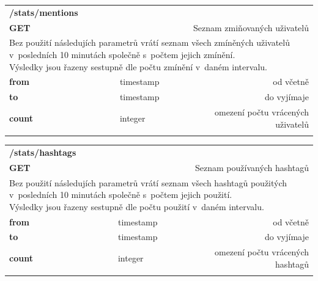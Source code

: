 \documentclass[thesis=B,czech]{FITthesis}[2012/06/26]
\begin{document}
\begin{table}[h]
\begin{tabular}{llllr}
\rowcolor[HTML]{EFEFEF}
\large \textbf{/stats/mentions}        &         &                 &        & \multicolumn{1}{l}{}                \\
\rowcolor[HTML]{EFEFEF}
\textbf{GET}          &         &                 &        & Seznam zmiňovaných uživatelů                        \\
\multicolumn{5}{l}{\parbox[t]{12.8cm}{Bez použití následujích parametrů vrátí seznam všech zmíněných uživatelů v~posledních 10 minutách společně s~počtem jejich zmínění. \\ Výsledky jsou řazeny sestupně dle počtu zmínění v~daném intervalu. }  } \\
\textbf{from}         &         & timestamp       &        & od včetně                           \\
\textbf{to}           &         & timestamp       &        & do vyjímaje                         \\
\textbf{count}        &         & integer         &        & omezení počtu vrácených uživatelů     \\ 
 & & & & \\
\end{tabular}
\end{table}


\begin{table}[h]
\begin{tabular}{llllr}
\rowcolor[HTML]{EFEFEF}
\large \textbf{/stats/hashtags}        &         &                 &        & \multicolumn{1}{l}{}                \\
\rowcolor[HTML]{EFEFEF}
\textbf{GET}          &         &                 &        & Seznam používaných hashtagů                        \\
\multicolumn{5}{l}{\parbox[t]{12.8cm}{Bez použití následujích parametrů vrátí seznam všech hashtagů použitých v~posledních 10 minutách společně s~počtem jejich použití. \\ Výsledky jsou řazeny sestupně dle počtu použití v~daném intervalu. }  } \\
\textbf{from}         &         & timestamp       &        & od včetně                           \\
\textbf{to}           &         & timestamp       &        & do vyjímaje                         \\
\textbf{count}        &         & integer         &        & omezení počtu vrácených hashtagů     \\
 & & & & \\
\end{tabular}
\end{table}
\end{document}
